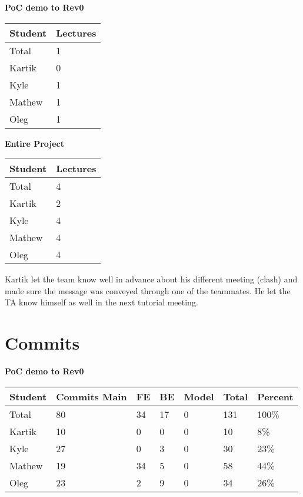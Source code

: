\documentclass{article}
\begin{document}
\begin{table}[H]
    \centering
    \textbf{PoC demo to Rev0}\\
    \begin{tabular}{ll}
    \toprule
    \textbf{Student} & \textbf{Lectures}\\
    \midrule
    Total & 1\\
    Kartik & 0\\
    Kyle   & 1\\
    Mathew & 1\\
    Oleg   & 1\\
    \bottomrule
    \end{tabular}
    \end{table}

\begin{table}[H]
\centering
\textbf{Entire Project}\\
\begin{tabular}{ll}
\toprule
\textbf{Student} & \textbf{Lectures}\\
\midrule
Total & 4\\
Kartik & 2\\
Kyle   & 4\\
Mathew & 4\\
Oleg   & 4\\
\bottomrule
\end{tabular}
\end{table}

Kartik let the team know well in advance about his different meeting (clash) and made sure the message was conveyed through one of the teammates. He let the TA know himself as well in the next tutorial meeting.

\section{Commits}


\begin{table}[H]
    \centering
    \textbf{PoC demo to Rev0}\\
    \begin{tabular}{lllllll}
    \toprule
    \textbf{Student} & \textbf{Commits Main} & \textbf{FE} & \textbf{BE} & \textbf{Model} & \textbf{Total}& \textbf{Percent}\\
    \midrule
    Total & 80 & 34 & 17 & 0 & 131 & 100\% \\
    Kartik & 10 & 0 & 0 & 0 & 10 & 8\%\\
    Kyle   & 27 & 0 & 3 & 0 & 30 & 23\%\\
    Mathew & 19 & 34 & 5 & 0 & 58 & 44\% \\
    Oleg   & 23 &  2 & 9 & 0 & 34 & 26\% \\
    \bottomrule
    \end{tabular}
\end{table}
\end{document}
